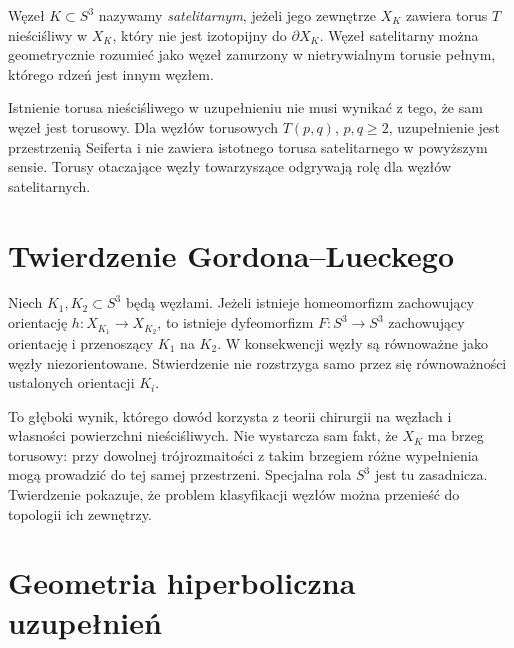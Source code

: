 \begin{definicja}
Węzeł $K\subset S^3$ nazywamy \emph{satelitarnym}, jeżeli jego
zewnętrze $X_K$ zawiera torus $T$ nieściśliwy w $X_K$,
który nie jest izotopijny do $\partial X_K$.
Węzeł satelitarny można geometrycznie rozumieć jako
węzeł zanurzony w nietrywialnym torusie pełnym, którego rdzeń
jest innym węzłem.
\end{definicja}

\begin{uwaga}
Istnienie torusa nieściśliwego w uzupełnieniu nie musi
wynikać z tego, że sam węzeł jest torusowy. Dla węzłów
torusowych $T(p,q)$, $p,q\geq2$, uzupełnienie jest
przestrzenią Seiferta i nie zawiera istotnego torusa
satelitarnego w powyższym sensie. Torusy otaczające
węzły towarzyszące odgrywają rolę dla węzłów satelitarnych.
\end{uwaga}

\section{Twierdzenie Gordona--Lueckego}
\label{sec:kt-gl}

\begin{twierdzenie}
Niech $K_1,K_2\subset S^3$ będą węzłami. Jeżeli istnieje
homeomorfizm zachowujący orientację
$h\colon X_{K_1}\to X_{K_2}$, to istnieje dyfeomorfizm
$F\colon S^3\to S^3$ zachowujący orientację i przenoszący
$K_1$ na $K_2$. W konsekwencji węzły są równoważne
jako węzły niezorientowane. Stwierdzenie nie rozstrzyga
samo przez się równoważności ustalonych orientacji $K_i$.
\end{twierdzenie}

\begin{uwaga}
To głęboki wynik, którego dowód korzysta z teorii chirurgii
na węzłach i własności powierzchni nieściśliwych.
Nie wystarcza sam fakt, że $X_K$ ma brzeg torusowy:
przy dowolnej trójrozmaitości z takim brzegiem różne
wypełnienia mogą prowadzić do tej samej przestrzeni.
Specjalna rola $S^3$ jest tu zasadnicza. Twierdzenie
pokazuje, że problem klasyfikacji węzłów można przenieść
do topologii ich zewnętrzy.
\end{uwaga}

\section{Geometria hiperboliczna uzupełnień}
\label{sec:kt-hyperbolic}

